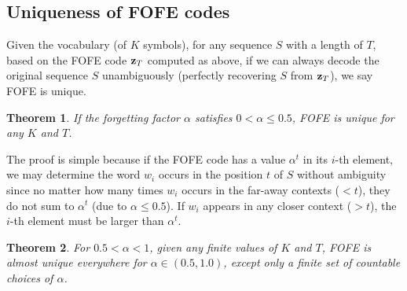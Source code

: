 \documentclass[11pt]{article}
\newtheorem{theorem}{Theorem}
\begin{document}
\subsection{Uniqueness of FOFE codes}

Given the vocabulary (of $K$ symbols), for any sequence $S$ with a length of $T$, based on the FOFE code ${\bf z}_T$ computed as above, if we can always decode the original sequence $S$ unambiguously (perfectly recovering $S$ from ${\bf z}_T$), we say FOFE is unique. 

\begin{theorem}
\label{theorem-FOFE-alpha-less-half}
If the forgetting factor $\alpha$ satisfies $0<\alpha \leq 0.5$, {\em FOFE} is unique for any $K$ and $T$.	
\end{theorem}

The proof is simple because if the FOFE code has a value $\alpha^t$ in its $i$-th element, we may determine the word $w_i$ occurs in the position $t$ of $S$ without ambiguity since no matter how many times $w_i$ occurs in the far-away contexts ($<t$), they do not sum to $\alpha^t$ (due to $\alpha \leq 0.5$). If $w_i$ appears in any closer context ($>t$), the $i$-th element must be larger than $\alpha^t$.

\begin{theorem}
\label{theorem-FOFE-alpha-less-one}
For $0.5 < \alpha <1$, given any finite values of $K$ and $T$,  {\em FOFE} is almost unique everywhere for  $\alpha \in (0.5, 1.0)$, except only a finite set of countable choices of $\alpha$. 	
\end{theorem}
\end{document}
